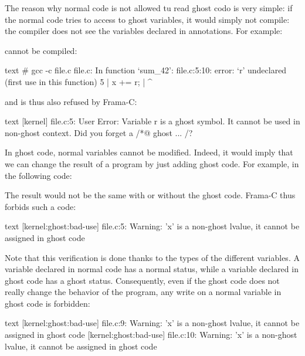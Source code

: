 The reason why normal code is not allowed tu read ghost codo is very
simple: if the normal code tries to access to ghost variables,
it would simply not compile: the compiler does not see the variables
declared in annotations. For example:




cannot be compiled:


\begin{CodeBlock}{text}
# gcc -c file.c
file.c: In function ‘sum_42’:
file.c:5:10: error: ‘r’ undeclared (first use in this function)
    5 |     x += r;
      |          ^
\end{CodeBlock}


and is thus also refused by Frama-C:


\begin{CodeBlock}{text}
[kernel] file.c:5: User Error:
  Variable r is a ghost symbol. It cannot be used in non-ghost context. Did you forget a /*@ ghost ... /?
\end{CodeBlock}


In ghost code, normal variables cannot be modified. Indeed, it
would imply that we can change the result of a program by just
adding ghost code. For example, in the following code:




The result would not be the same with or without the ghost code.
Frama-C thus forbids such a code:


\begin{CodeBlock}{text}
[kernel:ghost:bad-use] file.c:5: Warning:
  'x' is a non-ghost lvalue, it cannot be assigned in ghost code
\end{CodeBlock}


Note that this verification is done thanks to the types of the different
variables. A variable declared in normal code has a normal status, while
a variable declared in ghost code has a ghost status. Consequently, even
if the ghost code does not really change the behavior of the program, any
write on a normal variable in ghost code is forbidden:




\begin{CodeBlock}{text}
[kernel:ghost:bad-use] file.c:9: Warning:
  'x' is a non-ghost lvalue, it cannot be assigned in ghost code
[kernel:ghost:bad-use] file.c:10: Warning:
  'x' is a non-ghost lvalue, it cannot be assigned in ghost code
\end{CodeBlock}


